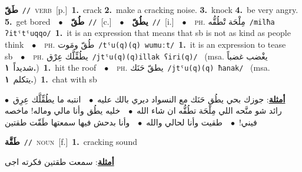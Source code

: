 \documentclass[10pt,a4paper,twoside]{article} %
\begin{document}
\begin{multicols}{2}
{\setlength\topsep{0pt}\textbf{\foreignlanguage{arabic}{طَقّ}}\ {\color{gray}\texttt{//}\color{black}}\ \textsc{verb}\ [p.]\ \textbf{1.}~crack  \textbf{2.}~make a cracking noise.  \textbf{3.}~knock  \textbf{4.}~be very angry.  \textbf{5.}~get bored\ \ $\bullet$\ \ \setlength\topsep{0pt}\textbf{\foreignlanguage{arabic}{طُقّ}}\ {\color{gray}\texttt{//}\color{black}}\ [c.]\ \ $\bullet$\ \ \setlength\topsep{0pt}\textbf{\foreignlanguage{arabic}{يطُقّ}}\ {\color{gray}\texttt{//}\color{black}}\ [i.]\ \ $\bullet$\ \ \textsc{ph.} \color{gray} \foreignlanguage{arabic}{مِلْحَة تْطُقُّه}\color{black}\ {\color{gray}\texttt{/{\sffamily milħa ʔitˤtˤuqqo}/}\color{black}}\ \textbf{1.}~it is an expression that means that sb is not as kind as people think\ \ $\bullet$\ \ \textsc{ph.} \color{gray} \foreignlanguage{arabic}{طُقّ ومَوت}\color{black}\ {\color{gray}\texttt{/{\sffamily tˤu(q)(q) wumuːt}/}\color{black}}\ \textbf{1.}~it is an expression to tease sb\ \ $\bullet$\ \ \textsc{ph.} \color{gray} \foreignlanguage{arabic}{يطُقِّلَّك عِرْق}\color{black}\ {\color{gray}\texttt{/{\sffamily jtˤu(q)(q)illak ʕiri(q)}/}\color{black}}\ \color{gray} (msa. \foreignlanguage{arabic}{يغْضب غضباً شديداً}~\foreignlanguage{arabic}{\textbf{١.}})\color{black}\ \textbf{1.}~hit the roof\ \ $\bullet$\ \ \textsc{ph.} \color{gray} \foreignlanguage{arabic}{يطقّ حَنَك}\color{black}\ {\color{gray}\texttt{/{\sffamily jtˤu(q)(q) ħanak}/}\color{black}}\ \color{gray} (msa. \foreignlanguage{arabic}{يتكلم}~\foreignlanguage{arabic}{\textbf{١.}})\color{black}\ \textbf{1.}~chat with sb\  \begin{flushright}\color{gray}\foreignlanguage{arabic}{\textbf{\underline{\foreignlanguage{arabic}{أمثلة}}}: جوزك بحي يطُق حَنَك مع النسواد ديري بالك عليه\ $\bullet$\ \  انتبه ما يطُقِّلَّك عِرِق\ $\bullet$\ \  رائد شو منَّحه اللي مِلْحَة تطُقُّه ان شاء الله\ $\bullet$\ \  خليه يطُق وأنا مالي وماله! ماخصه فيني!\ $\bullet$\ \  طقيت وأنا لحالي والله\ $\bullet$\ \  وأنا بدحش فيها سمعتها طَقّت طقتين}\end{flushright}\color{black}} \vspace{2mm}

{\setlength\topsep{0pt}\textbf{\foreignlanguage{arabic}{طَقَّة}}\ {\color{gray}\texttt{//}\color{black}}\ \textsc{noun}\ [f.]\ \textbf{1.}~cracking sound\  \begin{flushright}\color{gray}\foreignlanguage{arabic}{\textbf{\underline{\foreignlanguage{arabic}{أمثلة}}}: سمعت طقتين فكرته اجى}\end{flushright}\color{black}} \vspace{2mm}


\end{multicols}
\end{document}
